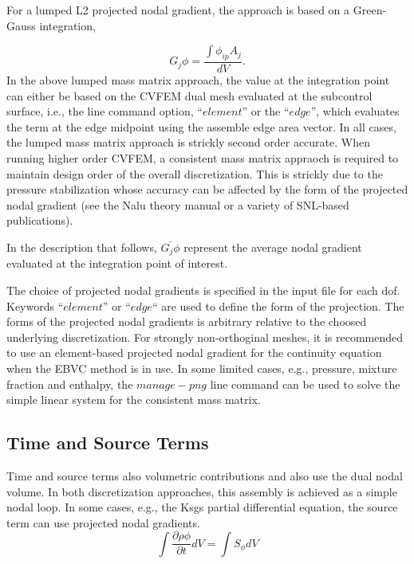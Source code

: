 For a lumped L2 projected nodal gradient,
the approach is based on a Green-Gauss integration,

\begin{equation}
G_j \phi = \frac{\int \phi_{ip} A_j}{dV}.
\label{greenGauss}
\end{equation}In the above lumped mass matrix approach, the value at the 
integration point can either be based on the CVFEM dual mesh 
evaluated at the subcontrol surface, i.e., the line command option, 
``$element$'' or the ``$edge$'', which evaluates the term at the edge 
midpoint using the assemble edge area vector. In all cases, the lumped mass
matrix approach is strickly second order accurate. When running higher order 
CVFEM, a consistent mass matrix appraoch is required to maintain design order 
of the overall discretization. This is strickly due to the pressure stabilization
whose accuracy can be affected by the form of the projected nodal gradient (see the Nalu
theory manual or a variety of SNL-based publications).

In the description that follows, $\bar{G_j \phi}$ represent the average nodal 
gradient evaluated at the integration point of interest.

The choice of projected nodal gradients is specified in the input file for each dof.
Keywords ``$element$'' or ``$edge$`` are used to define the form of the projection. The
forms of the projected nodal gradients is arbitrary relative to the choosed underlying
discretization. For strongly non-orthoginal meshes, it is recommended to use an element-based
projected nodal gradient for the continuity equation when the EBVC method is in use. In some limited
cases, e.g., pressure, mixture fraction and enthalpy, the $manage-png$ line command can be used to
solve the simple linear system for the consistent mass matrix.

\subsection{Time and Source Terms}
Time and source terms also volumetric contributions and also use the dual nodal volume. In both
discretization approaches, this assembly is achieved
as a simple nodal loop. In some cases, e.g., the Ksgs partial differential equation, the
source term can use projected nodal gradients.
\begin{equation}
  \int \frac{\partial \rho \phi }{\partial t} dV = \int S_{\phi}dV 
\end{equation}

